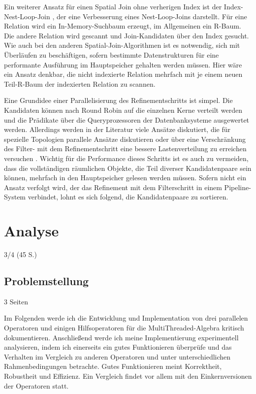 \documentclass[a4paper,12pt,twoside]{article}
\begin{document}
Ein weiterer Ansatz für einen Spatial Join ohne verherigen Index ist der Index-Nest-Loop-Join {\autocite[S. 10f]{Jacox2007}}, der eine Verbesserung eines Nest-Loop-Joins 
darstellt. Für eine Relation wird ein In-Memory-Suchbaum erzeugt, im Allgemeinen ein R-Baum. Die andere Relation wird gescannt und Join-Kandidaten über den Index gesucht. Wie auch bei den anderen Spatial-Join-Algorithmen ist es notwendig, sich mit Überläufen zu beschäftigen, sofern bestimmte Datenstrukturen für eine performante Ausführung im Hauptspeicher gehalten werden müssen. Hier wäre ein Ansatz denkbar, die nicht indexierte Relation mehrfach mit je einem neuen Teil-R-Baum der indexierten Relation zu scannen. 

Eine Grundidee einer Parallelisierung des Refinementschritts ist simpel. Die Kandidaten können nach Round Robin auf die einzelnen Kerne verteilt werden und die Prädikate über die Queryprozessoren der Datenbanksysteme ausgewertet werden. Allerdings werden in der Literatur viele Ansätze diskutiert, die für spezielle Topologien parallele Ansätze diskutieren {\autocite{Bouros2019, Rigaux2001}} oder über eine Verschränkung des Filter- mit dem Refinementschritt eine bessere Lastenverteilung zu erreichen versuchen {\autocite{Brinkhoff1996, Jacox2007, Zhou1998}}. Wichtig für die Performance dieses Schritts ist es auch zu vermeiden, dass die vollständigen räumlichen Objekte, die Teil diverser Kandidatenpaare sein können, mehrfach in den Hauptspeicher gelesen werden müssen. Sofern nicht ein Ansatz verfolgt wird, der das Refinement mit dem Filterschritt in einem Pipeline-System verbindet, lohnt es sich {\textcite[ S. 45f]{Jacox2007}} folgend, die Kandidatenpaare zu sortieren.

\section{Analyse}
3/4 (45 S.)

\subsection{Problemstellung} 3 Seiten

Im Folgenden werde ich die Entwicklung und Implementation von drei parallelen Operatoren und einigen Hilfsoperatoren für die MultiThreaded-Algebra kritisch dokumentieren. Anschließend werde ich meine Implementierung experimentell analysieren, indem ich einerseits ein gutes Funktionieren überprüfe und das Verhalten im Vergleich zu anderen Operatoren und unter unterschiedlichen Rahmenbedingungen betrachte. Gutes Funktionieren meint Korrektheit, Robustheit und Effizienz. Ein Vergleich findet vor allem mit den Einkernversionen der Operatoren statt.
\end{document}
